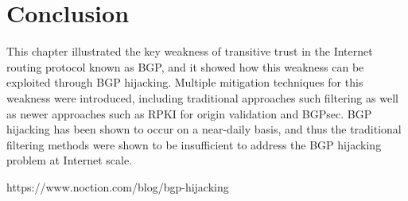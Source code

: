 \documentclass[conference]{IEEEtran}
\begin{document}
\section{Conclusion}
This chapter illustrated the key weakness of transitive trust in the Internet routing protocol known as BGP, and it showed how this weakness can be exploited through BGP hijacking.  Multiple mitigation techniques for this weakness were introduced, including traditional approaches such filtering as well as newer approaches such as RPKI for origin validation and BGPsec.  BGP hijacking has been shown to occur on a near-daily basis, and thus the traditional filtering methods were shown to be insufficient to address the BGP hijacking problem at Internet scale.

\begin{thebibliography}{00}
 https://www.noction.com/blog/bgp-hijacking
\end{thebibliography}

\newpage
\end{document}
